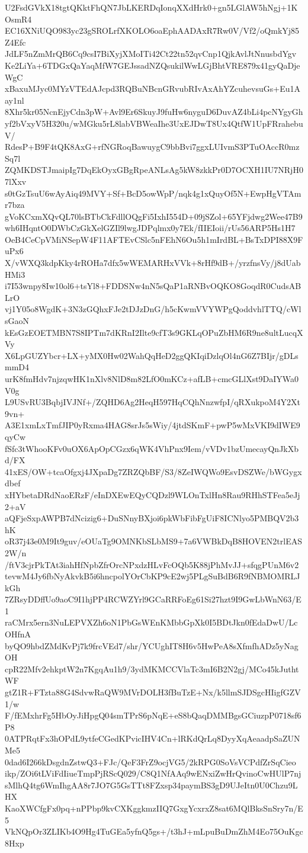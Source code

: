 U2FsdGVkX18tgtQKktFhQN7JbLKERDqIonqXXdHrk0+gn5LGlAW5hNgj+1KOsmR4
EC16XNiUQO983yc23gSROLrfXKOLO6oaEphAADAxR7Rw0V/Vf2/oQmkYj85Z4Efc
JdLF5nZmMrQB6Cq9csI7BiXyjXMoITi42Ct22tn52qvCnp1QjkAvlJtNnusbdYgv
Ke2LiYa+6TDGxQaYaqMfW7GEJssadNZQsukilWwLGjBhtVRE879x41gyQaDjeWgC
xBaxuMJyc0MYzVTEdAJcpd3RQBuNBcnGRvubRIvAxAhYZcuhevsuGs+Eu1Aay1nl
8Xhr5kr05NcnEjyCdn3pW+Avl9Er6SkuyJ9fuHw6nyguD6DuvAZ4bLi4pcNYgyGh
yf2bVxyV5H320u/wMGku5rL8labVBWeaIhe3UxEJDwT8Ux4QtfW1UpFRrahebuV/
RdesP+B9F4tQK8AxG+rfNGRoqBawuygC9bbBvi7ggxLUIvmS3PTuOAccR0mzSq7l
ZQMKDSTJmaipIg7DqEkOyxGBgRpeANLsAg5kW8zkkPr0D7OCXH1IU7NRjH07lXxv
s0tGzTsuU6wAyAiq49MVY+Sf+BcD5owWpP/nqk4g1xQuyOf5N+EwpHgVTAmr7bza
gVoKCxmXQvQL70lsBTbCkFdllOQgFi5IxhI554D+09jSZol+65YFjdwg2Wee47B9
wh6IHqntO0DWbCzGkXelGZIl9lwgJDPqlmx0y7Ek/fIIEIoii/rUs56ARP5Hs1H7
OeB4CeCpVMiNSepW4F11AFTEvCSlc5nFEhN6Ou5h1mIrdBL+BsTxDPI88X9FuPx6
X/vWXQ3kdpKky4rROHa7dfx5wWEMARHxVVk+8rHf9dB+/yrzfnsVy/j8dUabHMi3
i7I53wnpy8Iw10ol6+tsYl8+FDDSNw4nN5sQaP1aRNBvOQKO8GoqdR0CudsABLrO
vj1Y05o8WgdK+3N3zGQhxFJe2tDJzDnG/h5cKwmVVYWPgQoddvhlTTQ/cWlsGaoN
kEsGzEOETMBN7S8IPTm7dKRnI2Ilte9cfT3s9GKLqOPuZbHM6R9ne8ultLucqXVy
X6LpGUZYbcr+LX+yMX0Hw02WahQqHeD2ggQKIqiDzlqOl4nG6Z7BIjr/gDLsmmD4
urK8fmHdv7njzqwHK1nXlv8NlD8m82LfO0mKCz+afLB+cmcGLlXst9DaIYWa0V0g
L9USvRU3BqbjIVJNf+/ZQHD6Ag2HeqH597HqCQhNnzwfpI/qRXukpoM4Y2Xt9vn+
A3E1xmLxTmfJIP0yRxma4HAG8srJs5sWiy/4jtdSKmF+pwP5wMxVKI9dIWE9qyCw
fSfc3tWhooKFv0uOX6ApOpCGzx6qWK4VhPnx9Iem/vVDv1bzUmecayQnJkXbd/FX
41xES/OW+tcaOfgxj4JXpaDg7ZRZQbBF/S3/8ZeIWQWo9EsvDSZWe/bWGygxdbef
xHYbetaDRdNaoERzF/eInDXEwEQyCQDzl9WLOnTxlHn8Rau9RHhSTFea5eJj2+aV
aQFjeSxpAWPB7dNcizig6+DuSNnyBXjoi6pkWbFibFgUiF8ICNlyo5PMBQV2b3hK
oR37j43e0M9It9guv/eOUaTg9OMNKbSLbMS9+7a6VWBkDqB8HOVEN2trlEAS2W/n
/ftV3cjrPkTAt3iahHfNpbZfrOrcNPxdzHLvFcOQb5K88jPhMvJJ+sfqgPUnM6v2
tevwM4Jy6fbNyAkvkB5i6hncpolYOrCbKP9cE2wj5PLgSuBdB6R9fNBMOMRLJkGh
7ZRsyDDffUo9aoC9I1hjPP4RCWZYrl9GCaRRFoEg61Si27hzt9I9GwLbWnN63/E1
raCMrx5ern3NuLEPVXZh6oN1PbGsWEnKMbbGpXk0I5BDtJkn0fEdaDwU/LcOHfnA
byQO9hbdZMdKvPj7k9frcVEd7/shr/YCUghIT8H6v5HwPeA8sXfmfhADz5yNagOH
cpR22Mfv2ehkptW2n7KgqAu1h9/3ydMKMCCVlaTc3mI6B2N2gj/MCo45kJuthtWF
gtZ1R+FTzta88G4SdvwRaQW9MVrDOLH3fBuTzE+Nx/k5llmSJDSgcHIigfGZV1/w
F/fEMxhrFg5HbOyJiHpgQ04smTPrS6pNqE+eS8bQaqDMMBgsGCiuzpP0718sf6P8
0ATPRqtFx3hOPdL9ytfeCGedKPvicIHV4Cn+lRKdQrLq8DyyXqAeaadpSaZUNMe5
0dad6I266kDsgdnZstwQ3+FJc/QeF3FrZ9ocjVG5/2kRPG0SoVsVCPdfZrSqCieo
ikp/ZOi6tLViFdIiueTmpPjRScQ029/C8Q1NfAAq9wENxiZwHrQvinoCwHUlP7nj
sMlhQ4tg6WmIhgAA8r7JO7G5GsTTt8FZxsp34paymBS3gD9UJeItn0U0Chzu9LHX
KaoXWCfgFx0pq+nPPbp9kvCXKggkmzIIQ7GxgYcxrxZ8sat6MQlBksSnSry7n/E5
VkNQpOr3ZLIKb4O9Hg4TuGEa5yfnQ5gs+/t3hJ+mLpuBuDmZhM4Eo75OuKgc8Hxp
